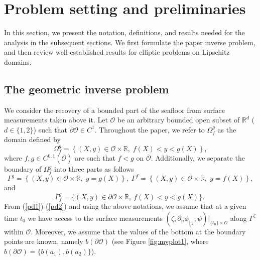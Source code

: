 \documentclass[11pt]{article}
\begin{document}
\section{Problem setting and preliminaries}\label{sec:backand-Problm}
In this section, we present the notation, definitions, and results needed for the analysis in the subsequent sections. We first formulate the paper inverse problem, and then review well-established results for elliptic problems on Lipschitz domains.


\subsection{The geometric inverse problem}\label{sec:introinverseproblem}
We consider the recovery of a bounded part of the seafloor from surface measurements taken above it. Let \(\mathcal O\) be an arbitrary bounded open subset of \(\mathbb{R}^d\) ($d\in \{1,2\}$) such that \(\partial\mathcal O \in C^{1}\). Throughout the paper, we refer to $\Omega_f^g$ as the domain defined by
\begin{equation}\label{domainrefdef}
    \Omega_f^g=\left\{(X,y)\in \mathcal O \times\mathbb{R},\; f(X)<y<g(X)\right\},
\end{equation}
where $f,g\in C^{0,1}(\overline{\mathcal O})$ are such that  $f<g$ on $\overline{\mathcal O }$. Additionally, we separate the boundary of $\Omega_f^g$ into three parts as follows
$$\Gamma^g=\left\{ (X,y)\in \mathcal O \times\mathbb{R},\;y=g(X)\right\},\;\Gamma^f=\left\{ (X,y)\in \mathcal O \times\mathbb{R},\;y=f(X)\right\},$$
and 
$$\Gamma^{g}_f=  \{ (X,y)\in \partial \mathcal O \times\mathbb{R},\ f(X)<y<g(X) \} .\;$$
From  (\ref{pd1})-(\ref{pd2}) and using the above notations, we assume that at a given time $t_0$ we have access to the surface measurements $(\zeta, \partial_n\phi_{|_{\Gamma^{\zeta}}}, \psi)|_{\{t_0\}\times \mathcal O }$ along $\Gamma^{\zeta}$  within  $\mathcal O $. Moreover, we assume that the values of the bottom at the boundary points are known, namely $b(\partial \mathcal O )$ (see Figure \ref{fig:myplot1}, where $b(\partial \mathcal O )=\{b(a_1),b(a_2)\}$).
\end{document}
